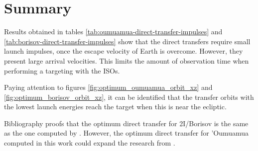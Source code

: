 \section{Summary}
\label{sec:direct-results}

Results obtained in tables \ref{tab:oumuamua-direct-transfer-impulses} and
\ref{tab:borisov-direct-transfer-impulses} show that the direct transfers
require small launch impulses, once the escape velocity of Earth is overcome.
However, they present large arrival velocities. This limits the amount of
observation time when performing a targeting with the ISOs.

Paying attention to figures \ref{fig:optimum_oumuamua_orbit_xz} and
\ref{fig:optimum_borisov_orbit_xz}, it can be identified that the transfer
orbits with the lowest launch energies reach the target when this is near the
ecliptic.

Bibliography proofs that the optimum direct transfer for 2I/Borisov is the same as
the one computed by \cite{hibberd2021}. However, the optimum direct transfer for
'Oumuamua computed in this work could expand the research from \cite{hein2018}.
